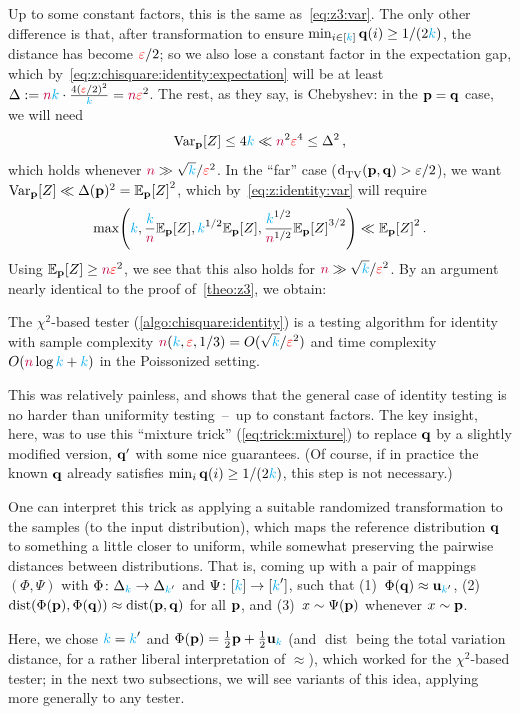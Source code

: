 Up to some constant factors, this is the same as~\eqref{eq:z3:var}. The only other difference is that, after transformation to ensure $\min_{i\in[{\textcolor{cyan}{k}}]} \mathbf{q}(i) \geq 1/(2{\textcolor{cyan}{k}})$, the distance has become $\textcolor{red}{\varepsilon}/2$; so we also lose a constant factor in the expectation gap, which by~\cref{eq:z:chisquare:identity:expectation} will be at least $\Delta := {\textcolor{purple}{n}}{\textcolor{cyan}{k}} \cdot \frac{4(\textcolor{red}{\varepsilon}/2)^2}{{\textcolor{cyan}{k}}} = {\textcolor{purple}{n}}\textcolor{red}{\varepsilon}^2$. The rest, as they say, is Chebyshev: in the $\mathbf{p}=\mathbf{q}$ case, we will need
\[
    \operatorname{Var}_{\mathbf{p}}[Z] \leq 4{\textcolor{cyan}{k}} \ll {\textcolor{purple}{n}}^2\textcolor{red}{\varepsilon}^4 \leq \Delta^2\,,
\]
which holds whenever ${\textcolor{purple}{n}} \gg \sqrt{{\textcolor{cyan}{k}}}/{\textcolor{red}{\varepsilon}^2}$. 
In the ``far'' case ($\totalvardist{\p}{\q} > \eps/2$), we want $\Var_\p[Z] \ll \Delta(\p)^2 = \bE{\p}{Z}^2$, which by~\cref{eq:z:identity:var} will require
\[
    \max\Paren{\ab, \frac{\ab}{\ns}\bE{\p}{Z}, \ab^{1/2}\bE{\p}{Z} , \frac{\ab^{1/2}}{\ns^{1/2}}\bE{\p}{Z}^{3/2} } \ll \bE{\p}{Z}^2\,.
\]
Using $\bE{\p}{Z} \geq \ns\dst^2$, we see that this also holds for ${\textcolor{purple}{n}} \gg \sqrt{{\textcolor{cyan}{k}}}/{\textcolor{red}{\varepsilon}^2}$. By an argument nearly identical to the proof of~\cref{theo:z3}, we obtain:
\begin{theorem}
  \label{theo:z}
The $\chi^2$-based tester (\cref{algo:chisquare:identity}) is a testing algorithm for identity with sample complexity ${\textcolor{purple}{n}}({\textcolor{cyan}{k}},\textcolor{red}{\varepsilon},1/3) = O(\sqrt{{\textcolor{cyan}{k}}}/\textcolor{red}{\varepsilon}^2)$ and time complexity $O({\textcolor{purple}{n}}\log{\textcolor{cyan}{k}}+{\textcolor{cyan}{k}})$ in the Poissonized setting.
\end{theorem}
This was relatively painless, and shows that the general case of identity testing is no harder than uniformity testing~--~up to constant factors. The key insight, here, was to use this ``mixture trick'' (\cref{eq:trick:mixture}) to replace $\mathbf{q}$ by a slightly modified version, $\mathbf{q}'$ with some nice guarantees. (Of course, if in practice the known $\mathbf{q}$ already satisfies $\min_i \mathbf{q}(i) \geq 1/(2{\textcolor{cyan}{k}})$, this step is not necessary.)\smallskip


One can interpret this trick as applying a suitable randomized transformation to the samples (\ie to the input distribution), which maps the reference distribution $\mathbf{q}$ to something a little closer to uniform, while somewhat preserving the pairwise distances between distributions. That is, coming up with a pair of mappings $(\Phi,\Psi)$ with $\Phi\colon\Delta_{{\textcolor{cyan}{k}}} \to \Delta_{{\textcolor{cyan}{k}}'}$ and $\Psi\colon[{\textcolor{cyan}{k}}]\to[{\textcolor{cyan}{k}}']$, such that (1)~$\Phi(\mathbf{q})\approx \mathbf{u}_{{\textcolor{cyan}{k}}'}$, (2)~$\operatorname{dist}(\Phi(\mathbf{p}),\Phi(\mathbf{q}))\approx \operatorname{dist}(\mathbf{p},\mathbf{q})$ for all $\mathbf{p}$, and (3)~$x\sim \Psi(\mathbf{p})$ whenever $x\sim\mathbf{p}$.

Here, we chose ${\textcolor{cyan}{k}}={\textcolor{cyan}{k}}'$ and $\Phi(\mathbf{p}) = \frac{1}{2}\mathbf{p}+\frac{1}{2}\mathbf{u}_{\textcolor{cyan}{k}}$ (and $\operatorname{dist}$ being the total variation distance, for a rather liberal interpretation of $\approx$), which worked for the $\chi^2$-based tester; in the next two subsections, we will see variants of this idea, applying more generally to any tester.
